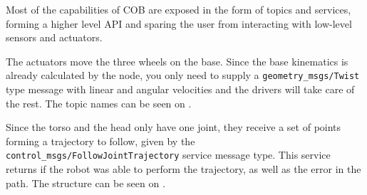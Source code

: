Most of the capabilities of COB are exposed in the form of topics and services, forming a higher level API and sparing the user from interacting with low-level sensors and actuators.

The actuators move the three wheels on the base. Since the base kinematics is already calculated by the node, you only need to supply a \texttt{geometry\_msgs/Twist} type message with linear and angular velocities and the drivers will take care of the rest. The topic names can be seen on .

\begin{table}[!ht]
\caption{Base command API.} \label{tab:baseapi}
\renewcommand*{\arraystretch}{1.1}
\end{table}

Since the torso and the head only have one joint, they receive a set of points forming a trajectory to follow, given by the \texttt{control\_msgs/FollowJointTrajectory} service message type. This service returns if the robot was able to perform the trajectory, as well as the error in the path. The structure can be seen on .

\begin{table}[!ht]
\caption{Torso and head command API.} \label{tab:headapi}
\renewcommand*{\arraystretch}{1.1}
\end{table}

